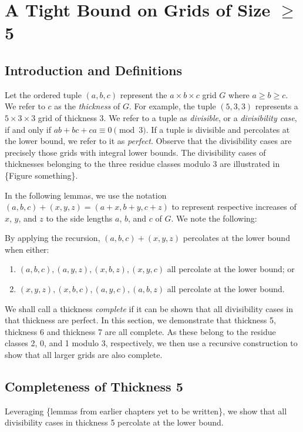 \chapter{A Tight Bound on Grids of Size $\geq$ 5}

\section{Introduction and Definitions}
Let the ordered tuple $(a,b,c)$ represent the $a \times b \times c$ grid $G$ where $a \geq b \geq c$. We refer to $c$ as the \emph{thickness} of $G$. For example, the tuple $(5,3,3)$ represents a $5 \times 3 \times 3$ grid of thickness 3. We refer to a tuple as \emph{divisible}, or a \emph{divisibility case}, if and only if $ab+bc+ca \equiv 0 \pmod 3$. If a tuple is divisible and percolates at the lower bound, we refer to it as \emph{perfect}. Observe that the divisibility cases are precisely those grids with integral lower bounds. The divisibility cases of thicknesses belonging to the three residue classes modulo 3 are illustrated in \{Figure something\}.

In the following lemmas, we use the notation $(a,b,c)+(x,y,z) = (a+x, b+y, c+z)$ to represent respective increases of $x$, $y$, and $z$ to the side lengths $a$, $b$, and $c$ of $G$. We note the following: 
\begin{rem}
\label{rem:recursion_pieces}
By applying the recursion, $(a,b,c)+(x,y,z)$ percolates at the lower bound when either:
\begin{enumerate}
\item $(a,b,c), (a,y,z), (x,b,z), (x,y,c)$ all percolate at the lower bound; or
\item $(x,y,z), (x,b,c), (a,y,c), (a,b,z)$ all percolate at the lower bound.
\end{enumerate}
\end{rem}

We shall call a thickness \emph{complete} if it can be shown that all divisibility cases in that thickness are perfect. In this section, we demonstrate that thickness 5, thickness 6 and thickness 7 are all complete. As these belong to the residue classes 2, 0, and 1 modulo 3, respectively, we then use a recursive construction to show that all larger grids are also complete. 

\section{Completeness of Thickness 5}
Leveraging \{lemmas from earlier chapters yet to be written\}, we show that all divisibility cases in thickness 5 percolate at the lower bound. 

